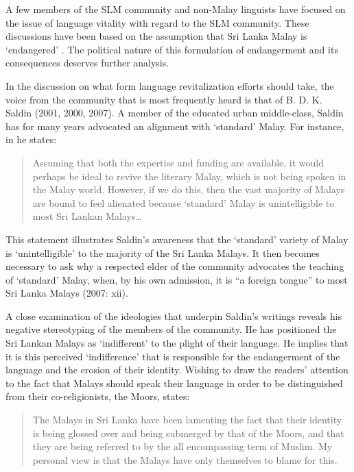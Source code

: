 A few members of the SLM community  \citep{Saldin2000,Saldin2001,Saldin2007dico, Thaliph2005} and non-Malay linguists \citep{Ansaldo2008genesis,AnsaldoEtAl2006, LimEtAl2006,LimEtAl2007} have focused on the issue of language vitality with regard to the SLM community. These discussions have been based on the assumption that Sri Lanka Malay is `endangered' \citep{Saldin2001,AnsaldoEtAl2006,LimEtAl2007}. The political nature of this formulation of endangerment and its consequences deserves further analysis. 

In the discussion on what form language revitalization efforts should take, the voice from the community that is most frequently heard is that of B. D. K. Saldin (2001, 2000, 2007)\nocite{Saldin2000,Saldin2001,Saldin2007dico}. A member of the educated urban middle-class, Saldin has for many years advocated an alignment with `standard' Malay. For instance, in \citet[xii]{Saldin2007} he states:

\begin{quote}
Assuming that both the expertise and funding are available, it would perhaps be ideal to revive the literary Malay, which is not being spoken in the Malay world. However, if we do this, then the vast majority of Malays are bound to feel alienated because `standard' Malay is unintelligible to most Sri Lankan Malays{\dots}
\end{quote}

This statement illustrates Saldin's awareness that the `standard' variety of Malay is `unintelligible' to the majority of the Sri Lanka Malays. It then becomes necessary to ask why a respected elder of the community advocates the teaching of `standard' Malay, when, by his own admission, it is ``a foreign tongue'' to most Sri Lanka Malays (2007: xii).

A close examination of the ideologies that underpin Saldin's writings reveals his negative stereotyping of the members of the community. He has positioned the Sri Lankan Malays as `indifferent' to the plight of their language. He implies that it is this perceived `indifference' that is responsible for the endangerment of the language and the erosion of their identity. Wishing to draw the readers' attention to the fact that Malays should speak their language in order to be distinguished from their co-religionists, the Moors, \citet[vii]{Saldin2001} states: 

\begin{quote}
The Malays in Sri Lanka have been lamenting the fact that their identity is being glossed over and being submerged by that of the Moors, and that they are being referred to by the all encompassing term of Muslim. My personal view is that the Malays have only themselves to blame for this. 
\end{quote}

